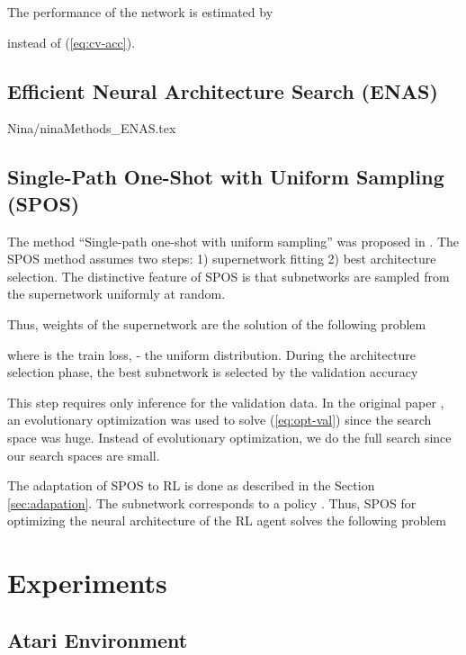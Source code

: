 \documentclass{svproc}
\begin{document}
The performance of the network is estimated by 

instead of (\ref{eq:cv-acc}).

\subsection{Efficient Neural Architecture Search (ENAS)}
{Nina/ninaMethods_ENAS.tex}

\subsection{Single-Path One-Shot with Uniform Sampling (SPOS)}

The method ``Single-path one-shot with uniform sampling'' was proposed in \cite{guo2019single}.
The SPOS method assumes two steps: 1) supernetwork fitting 2) best architecture selection.
The distinctive feature of SPOS is that subnetworks are sampled from the supernetwork uniformly at random.

Thus, weights  of the supernetwork are the solution of the following problem 

where  is the train loss,  - the uniform distribution.
During the architecture selection phase, the best subnetwork  is selected by the validation accuracy 

This step requires only inference for the validation data. 
In the original paper \cite{guo2019single}, an evolutionary optimization was used to solve (\ref{eq:opt-val}) since the search space was huge. Instead of evolutionary optimization, we do the full search since our search spaces are small.

The adaptation of SPOS to RL is done as described in the Section \ref{sec:adapation}. The subnetwork  corresponds to a policy . 
Thus, SPOS for optimizing the neural architecture of the RL agent solves the following problem










\section{Experiments}

\subsection{Atari Environment}
\label{sec:atari}
\end{document}
